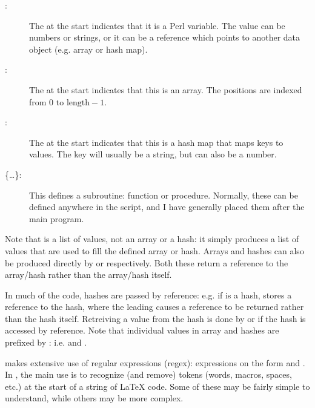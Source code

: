 \documentclass{article}
\newcommand\eqsim{$=\sim$}
\begin{document}
\begin{description}

\item[:] The \code{\$} at the start indicates that it is a Perl variable. The value can be numbers or strings, or it can be a reference which points to another data object (e.g. array or hash map).

\item[:] The  at the start indicates that this is an array. The positions are indexed from 0 to $\textrm{length}-1$.

\item[:] The \code{\%} at the start indicates that this is a hash map that maps keys to values. The key will usually be a string, but can also be a number.

\item[ \{\ldots\}:] This defines a subroutine: function or procedure. Normally, these can be defined anywhere in the script, and I have generally placed them after the main program.

\end{description}

Note that  is a list of values, not an array or a hash: it simply produces a list of values that are used to fill the defined array or hash. Arrays and hashes can also be produced directly by  or  respectively. Both these return a reference to the array/hash rather than the array/hash itself.

In much of the code, hashes are passed by reference: e.g. if  is a hash,  stores a reference to the hash, where the leading \code{\bs{}} causes a reference to be returned rather than the hash itself. Retreiving a value from the hash is done by  or  if the hash is accessed by reference. Note that individual values in array and hashes are prefixed by \code{\$}: i.e.  and .

\TeXcount{} makes extensive use of regular expressions (regex): expressions on the form \code{\$\textit{string}\eqsim/\textit{pattern}/} and \code{\$\textit{string}\eqsim s/\textit{pattern}/\textit{replace}/}. In \TeXcount{}, the main use is to recognize (and remove) tokens (words, macros, spaces, etc.) at the start of a string of \LaTeX{} code. Some of these may be fairly simple to understand, while others may be more complex.
\end{document}
